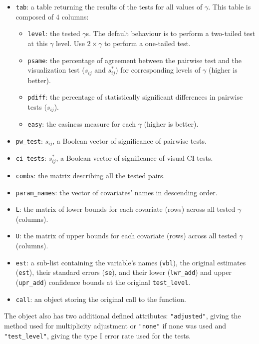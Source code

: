 \begin{itemize}
\tightlist
\item
  \texttt{tab}: a table returning the results of the tests for all values of \(\gamma\). This table is composed of 4 columns:

  \begin{itemize}
  \tightlist
  \item
    \texttt{level}: the tested \(\gamma\)s. The default behaviour is to perform a two-tailed test at this \(\gamma\) level. Use \(2\times\gamma\) to perform a one-tailed test.
  \item
    \texttt{psame}: the percentage of agreement between the pairwise test and the visualization test (\(s_{ij}\) and \(s_{ij}^*\)) for corresponding levels of \(\gamma\) (higher is better).
  \item
    \texttt{pdiff}: the percentage of statistically significant differences in pairwise tests (\(s_{ij}\)).
  \item
    \texttt{easy}: the easiness measure for each \(\gamma\) (higher is better).
  \end{itemize}
\item
  \texttt{pw\_test}: \(s_{ij}\), a Boolean vector of significance of pairwise tests.
\item
  \texttt{ci\_tests}: \(s_{ij}^*\), a Boolean vector of significance of visual CI tests.
\item
  \texttt{combs}: the matrix describing all the tested pairs.
\item
  \texttt{param\_names}: the vector of covariates' names in descending order.
\item
  \texttt{L}: the matrix of lower bounds for each covariate (rows) across all tested \(\gamma\) (columns).
\item
  \texttt{U}: the matrix of upper bounds for each covariate (rows) across all tested \(\gamma\) (columns).
\item
  \texttt{est}: a sub-list containing the variable's names (\texttt{vbl}), the original estimates (\texttt{est}), their standard errors (\texttt{se}), and their lower (\texttt{lwr\_add}) and upper (\texttt{upr\_add}) confidence bounds at the original \texttt{test\_level}.
\item
  \texttt{call}: an object storing the original call to the function.
\end{itemize}

The object also has two additional defined attributes: \texttt{"adjusted"}, giving the method used for multiplicity adjustment or \texttt{"none"} if none was used and \texttt{"test\_level"}, giving the type I error rate used for the tests.

